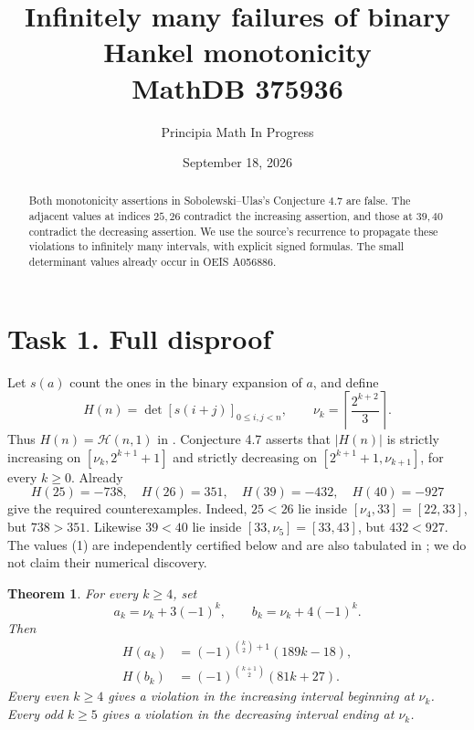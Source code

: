 \documentclass[11pt]{article}
\title{Infinitely many failures of binary Hankel monotonicity\\\large MathDB 375936}
\author{Principia Math In Progress}
\date{September 18, 2026}
\newtheorem{theorem}{Theorem}
\newcommand{\HH}{\mathcal H}
\begin{document}
\maketitle
\begin{abstract}
Both monotonicity assertions in Sobolewski--Ulas's Conjecture 4.7
are false. The adjacent values at indices $25,26$ contradict the
increasing assertion, and those at $39,40$ contradict the decreasing
assertion. We use the source's recurrence to propagate these
violations to infinitely many intervals, with explicit signed formulas.
The small determinant values already occur in OEIS A056886.
\end{abstract}

\section*{Task 1. Full disproof}
Let $s(a)$ count the ones in the binary expansion of $a$, and define
\[
 H(n)=\det[s(i+j)]_{0\le i,j<n},\qquad
 \nu_k=\left\lceil\frac{2^{k+2}}3\right\rceil.
\]
Thus $H(n)=\HH(n,1)$ in \cite{SU}. Conjecture 4.7 asserts that
$|H(n)|$ is strictly increasing on $[\nu_k,2^{k+1}+1]$ and
strictly decreasing on $[2^{k+1}+1,\nu_{k+1}]$, for every $k\ge0$.
Already
\[
 H(25)=-738,\quad H(26)=351,\quad
 H(39)=-432,\quad H(40)=-927                              \tag{1}
\]
give the required counterexamples. Indeed, $25<26$ lie inside
$[\nu_4,33]=[22,33]$, but $738>351$. Likewise $39<40$ lie inside
$[33,\nu_5]=[33,43]$, but $432<927$.
The values (1) are independently certified below and are also
tabulated in \cite{OEIS}; we do not claim their numerical discovery.

\begin{theorem}
For every $k\ge4$, set
\[
 a_k=\nu_k+3(-1)^k,\qquad b_k=\nu_k+4(-1)^k.
\]
Then
\[
 \begin{aligned}
 H(a_k)&=(-1)^{\binom{k}{2}+1}(189k-18),\\
 H(b_k)&=(-1)^{\binom{k+1}{2}}(81k+27).
 \end{aligned}                                               \tag{2}
\]
Every even $k\ge4$ gives a violation in the increasing interval
beginning at $\nu_k$. Every odd $k\ge5$ gives a violation in the
decreasing interval ending at $\nu_k$.
\end{theorem}
\end{document}
